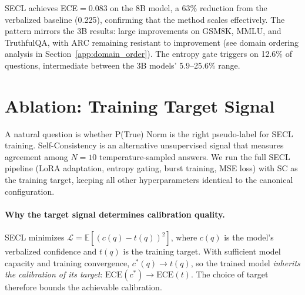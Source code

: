 SECL achieves ECE$=$0.083 on the 8B model, a 63\% reduction from the
verbalized baseline (0.225), confirming that the method scales
effectively. The pattern mirrors the 3B results: large improvements
on GSM8K, MMLU, and TruthfulQA, with ARC remaining resistant to
improvement (see domain ordering analysis in Section~\ref{app:domain_order}).
The entropy gate triggers on 12.6\% of questions, intermediate between
the 3B models' 5.9--25.6\% range.

\section{Ablation: Training Target Signal}
\label{app:target_ablation}

A natural question is whether P(True) Norm is the right pseudo-label
for SECL training.
Self-Consistency \citep[SC;][]{wang_selfconsistency_2023} is an alternative unsupervised signal that
measures agreement among $N{=}10$ temperature-sampled answers.
We run the full SECL pipeline (LoRA adaptation, entropy gating,
burst training, MSE loss) with SC as the training target, keeping
all other hyperparameters identical to the canonical configuration.

\begin{table}[htbp]
\centering
\small
{}%
\caption{Effect of training target on Llama~3.2-3B.
All rows use the same SECL pipeline; only the pseudo-label
differs. Self-Consistency as a target degrades calibration below
the untrained baseline.}
\label{tab:target_ablation}
\end{table}

\paragraph{Why the target signal determines calibration quality.}
SECL minimizes $\mathcal{L} = \mathbb{E}[(c(q) - t(q))^2]$, where
$c(q)$ is the model's verbalized confidence and $t(q)$ is the
training target.
With sufficient model capacity and training convergence,
$c^*(q) \to t(q)$, so the trained model \emph{inherits the
calibration of its target}:
$\mathrm{ECE}(c^*) \to \mathrm{ECE}(t)$.
The choice of target therefore bounds the achievable calibration.

